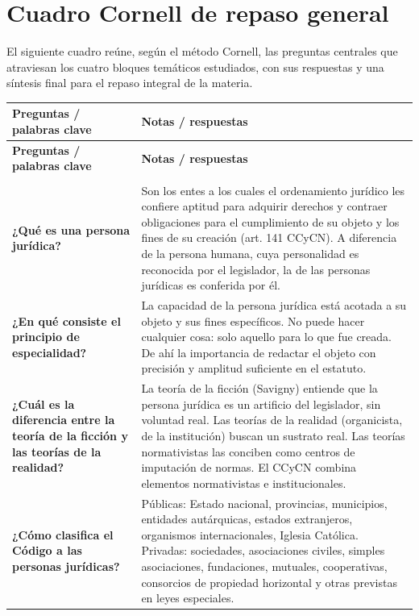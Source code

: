 \documentclass[12pt,oneside]{book}
\newcommand{\cornellhead}{%
\toprule
\textbf{Preguntas / palabras clave} & \textbf{Notas / respuestas} \\
\midrule
}
\begin{document}

\section{Cuadro Cornell de repaso general}

El siguiente cuadro reúne, según el método Cornell, las preguntas centrales que atraviesan los cuatro bloques temáticos estudiados, con sus respuestas y una síntesis final para el repaso integral de la materia.

\begin{longtable}{
    >{\raggedright\arraybackslash}p{}
    >{\raggedright\arraybackslash}p{}
}
\cornellhead
\endfirsthead
\cornellhead
\endhead
\midrule
\multicolumn{2}{r}{\textit{continúa en la página siguiente}} \\
\midrule
\endfoot
\bottomrule
\endlastfoot

\textbf{¿Qué es una persona jurídica?} &
Son los entes a los cuales el ordenamiento jurídico les confiere aptitud para adquirir derechos y contraer obligaciones para el cumplimiento de su objeto y los fines de su creación (art. 141 CCyCN). A diferencia de la persona humana, cuya personalidad es reconocida por el legislador, la de las personas jurídicas es conferida por él. \\[0.4em]

\textbf{¿En qué consiste el principio de especialidad?} &
La capacidad de la persona jurídica está acotada a su objeto y sus fines específicos. No puede hacer cualquier cosa: solo aquello para lo que fue creada. De ahí la importancia de redactar el objeto con precisión y amplitud suficiente en el estatuto. \\[0.4em]

\textbf{¿Cuál es la diferencia entre la teoría de la ficción y las teorías de la realidad?} &
La teoría de la ficción (Savigny) entiende que la persona jurídica es un artificio del legislador, sin voluntad real. Las teorías de la realidad (organicista, de la institución) buscan un sustrato real. Las teorías normativistas las conciben como centros de imputación de normas. El CCyCN combina elementos normativistas e institucionales. \\[0.4em]

\textbf{¿Cómo clasifica el Código a las personas jurídicas?} &
Públicas: Estado nacional, provincias, municipios, entidades autárquicas, estados extranjeros, organismos internacionales, Iglesia Católica. Privadas: sociedades, asociaciones civiles, simples asociaciones, fundaciones, mutuales, cooperativas, consorcios de propiedad horizontal y otras previstas en leyes especiales. \\[0.4em]


\end{longtable}
\end{document}
